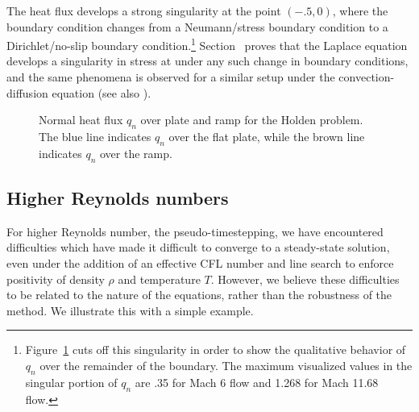 The heat flux develops a strong singularity at the point $(-.5,0)$, where the boundary condition changes from a Neumann/stress boundary condition to a Dirichlet/no-slip boundary condition.\footnote{Figure~\ref{fig:heatFlux} cuts off this singularity in order to show the qualitative behavior of $q_n$ over the remainder of the boundary.  The maximum visualized values in the singular portion of $q_n$ are .35 for Mach 6 flow and 1.268 for Mach 11.68 flow.}  Section~ proves that the Laplace equation develops a singularity in stress at under any such change in boundary conditions, and the same phenomena is observed for a similar setup under the convection-diffusion equation (see also \cite{localConservationDPG}).  

\begin{figure}
\centering
{}
\caption{Normal heat flux $q_n$ over plate and ramp for the Holden problem.  The blue line indicates $q_n$ over the flat plate, while the brown line indicates $q_n$ over the ramp. }
\label{fig:heatFlux}
\end{figure}

\subsection{Higher Reynolds numbers}
For higher Reynolds number, the pseudo-timestepping, we have encountered difficulties which have made it difficult to converge to a steady-state solution, even under the addition of an effective CFL number and line search to enforce positivity of density $\rho$ and temperature $T$.  However, we believe these difficulties to be related to the nature of the equations, rather than the robustness of the method.  We illustrate this with a simple example.  

